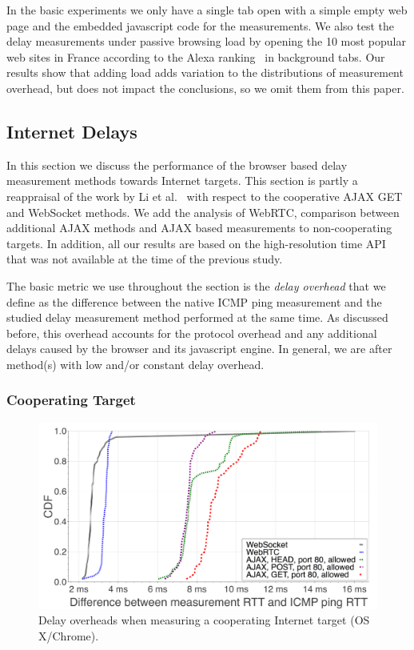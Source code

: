 \documentclass{sig-alternate-10pt}
\begin{document}
In the basic experiments we only have a single tab open with a simple empty web page and the embedded javascript code for the measurements. We also test the delay measurements under passive browsing load by opening the 10 most popular web sites in France according to the Alexa ranking~\cite{alexa_top_2016} in background tabs. Our results show that adding load adds 
variation to the distributions of measurement overhead, but does not impact the conclusions, so we omit them from this paper.

\subsection{Internet Delays}
\label{subsec:servers}

In this section we discuss the performance of the browser based delay measurement methods towards Internet targets. This section is partly a reappraisal of the work by Li et al.~\cite{li_appraising_2013} with respect to the cooperative AJAX GET and WebSocket methods. We add the analysis of WebRTC, comparison between additional AJAX methods and AJAX based measurements to non-cooperating targets. In addition, all our results are based on the high-resolution time API that was not available at the time of the previous study.

The basic metric we use throughout the section is the \textit{delay overhead} that we define as the difference between the native ICMP ping measurement and the studied delay measurement method performed at the same time. As discussed before, this overhead accounts for the protocol overhead and any additional delays caused by the browser and its javascript engine. In general, we are after method(s) with low and/or constant delay overhead.

\subsubsection{Cooperating Target}

\begin{figure}[thb]
\includegraphics[width=\columnwidth]{figures/inet-coop}
\caption{Delay overheads when measuring a cooperating Internet target (OS X/Chrome).}
\label{fig:inet_coop}
\end{figure}
\end{document}
